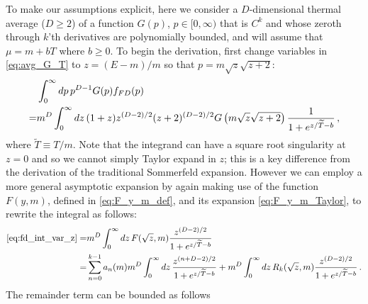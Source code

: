 \documentclass[sn-mathphys,Numbered]{sn-jnl}
\begin{document}


  To make our assumptions explicit, here we  consider a $D$-dimensional thermal average ($D\geq 2$) of a function   $G(p)$, $p\in[0,\infty)$ that is  $C^k$ and whose zeroth through $k$'th derivatives are polynomially bounded, and  will assume that $\mu=m+bT$ where $b\geq 0$. To begin the derivation, first change variables  in \eqref{eq:avg_G_T}  to $z=(E-m)/m$ so that $p=m\sqrt{z}\sqrt{z+2}$:
\begin{align}
&\int_0^\infty dp\, p^{D-1} G(p) f_{FD}(p)\notag\\
=&m^{D}\int_0^\infty dz\, (1+z) z^{(D-2)/2} (z+2)^{(D-2)/2} G\left(m\sqrt{z}\sqrt{z+2}\right) \frac{1}{1+e^{z/\widetilde{T}-b}}\,,\label{eq:fd_int_var_z}
\end{align}
where $\widetilde{T}\equiv T/m$.  Note that the integrand can have a square root singularity at $z=0$ and so we cannot simply Taylor expand in $z$; this is a key difference from the derivation of the traditional Sommerfeld expansion.  However we can employ a more general asymptotic expansion  by again making use of the function $F(y,m)$, defined in \eqref{eq:F_y_m_def}, and its expansion \eqref{eq:F_y_m_Taylor}, to rewrite the integral as follows:
\begin{align}
    \eqref{eq:fd_int_var_z}=&m^{D}\int_0^\infty dz\, F(\sqrt{z},m)\frac{z^{(D-2)/2}}{1+e^{z/\widetilde{T}-b}}\\
    =&\sum_{n=0}^{k-1} a_n(m)m^{D}\int_0^\infty dz\,  \frac{z^{(n+D-2)/2}}{1+e^{z/\widetilde{T}-b}}+m^{D}\int_0^\infty dz\, R_k(\sqrt{z},m)\frac{z^{(D-2)/2}}{1+e^{z/\widetilde{T}-b}}\,.\notag
\end{align}
The remainder term can be bounded as follows
\end{document}
